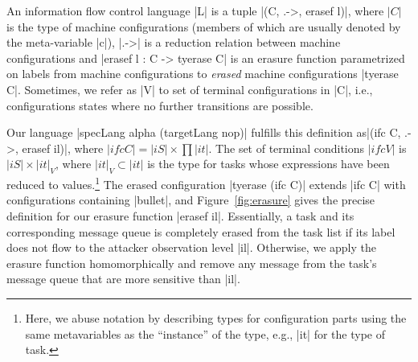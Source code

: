\begin{definition}
    An information flow control language |L| is a tuple |(C, .->,
    erasef l)|, where $|C|$ is the type of machine configurations (members
    of which are usually denoted by the meta-variable |c|), |.->| is a
    reduction relation between machine configurations and |erasef l : C -> tyerase C|
    is an erasure function parametrized on labels from machine configurations to \emph{erased} machine
    configurations |tyerase C|.  Sometimes, we refer as |V| to set of
     terminal configurations in |C|, i.e., configurations states where
     no further transitions are possible.
\end{definition}

Our language |specLang alpha (targetLang nop)| fulfills
this definition as|(ifc C, .->, erasef il)|, where
$|ifc C| = |iS| \times \prod |it|$.  The set of terminal conditions
$|ifc V|$ is $|iS| \times |it|_V$, where $|it|_V \subset |it|$ is the
type for tasks whose expressions have been reduced to
values.\footnote{
  Here, we abuse notation by describing types for configuration parts using the
  same metavariables as the ``instance'' of the type, e.g., |it| for the type of
  task.
}
The erased configuration |tyerase (ifc C)| extends |ifc C| with configurations
containing |bullet|, and Figure~\ref{fig:erasure} gives the precise definition for
our erasure function |erasef il|.
%
Essentially, a task and its corresponding message queue is completely erased from the task
list if its label does not flow to the attacker observation level |il|.
Otherwise, we apply the erasure function homomorphically and remove any message
from the task's message queue that are more sensitive than |il|.

